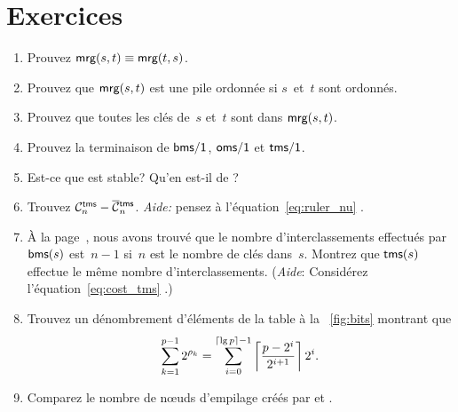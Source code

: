 \section*{Exercices}

\begin{enumerate}

  \item Prouvez \(\textsf{mrg}(s,t) \equiv \textsf{mrg}(t,s)\).

  \item Prouvez que \(\textsf{mrg}(s,t)\) est une
    pile ordonnée si \(s\)~et~\(t\) sont ordonnés.

  \item Prouvez que toutes les clés de~\(s\) et~\(t\) sont dans
  \(\textsf{mrg}(s,t)\).

  \item Prouvez la terminaison de \(\textsf{bms/1}\), \(\textsf{oms/1}\) et
    \(\textsf{tms/1}\).

  \item Est-ce que  est stable? Qu'en est-il de ?

  \item Trouvez \(\C{\fun{tms}}{n} - \OC{\fun{tms}}{n}\). \emph{Aide:}
    pensez à l'équation~\eqref{eq:ruler_nu} .

  \item À la page~\pageref{eq:bms_merges}, nous avons trouvé que le
    nombre d'interclassements effectués par \(\textsf{bms}(s)\)
    est~\(n-1\) si~\(n\) est le nombre de clés dans~\(s\). Montrez que
    \(\textsf{tms}(s)\) effectue le même nombre
    d'interclassements. (\emph{Aide}: Considérez
    l'équation~\eqref{eq:cost_tms} .)

  \item Trouvez un dénombrement d'éléments de la table à la
    \fig~\vref{fig:bits} montrant que
    \begin{equation*}
      \sum_{k=1}^{p-1}{2^{\rho_k}}
      = \sum_{i=0}^{\ceiling{\lg p}-1}%
      {\left\lceil\frac{p-2^i}{2^{i+1}}\right\rceil 2^i}.
    \end{equation*}

  \item Comparez le nombre de nœuds d'empilage créés par  et .

\end{enumerate}
